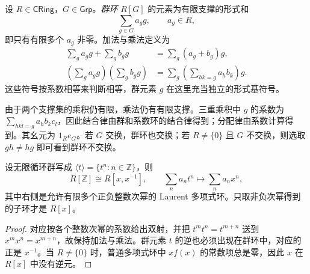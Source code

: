 \documentclass[lang=cn,a4paper,fontset=none,zihao=false,10pt,openany,twoside]{beautybook}
\numberwithin{algorithm}{chapter}
\begin{document}
\begin{definition}[群环]
设 $R\in\mathsf{CRing}$，$G\in\mathsf{Grp}$。\emph{群环} $R[G]$ 的元素为有限支撑的形式和
\[
 \sum_{g\in G}a_gg,\qquad a_g\in R,
\]
即只有有限多个 $a_g$ 非零。加法与乘法定义为
\[
 \begin{aligned}
 \sum_g a_gg+\sum_g b_gg&=\sum_g(a_g+b_g)g,\\
 \left(\sum_g a_gg\right)\left(\sum_g b_gg\right)
   &=\sum_g\left(\sum_{hk=g}a_hb_k\right)g.
 \end{aligned}
\]
这些符号按系数相等来判断相等，群元素 $g$ 在这里充当独立的形式基符号。
\end{definition}
由于两个支撑集的乘积仍有限，乘法仍有有限支撑。三重乘积中 $g$ 的系数为 $\sum_{hkl=g}a_hb_kc_l$，因此结合律由群和系数环的结合律得到；分配律由系数计算得到。其幺元为 $1_R e_G$。若 $G$ 交换，群环也交换；若 $R\ne\{0\}$ 且 $G$ 不交换，则选取 $gh\ne hg$ 即可看到群环不交换。

\begin{example}[无限循环群的群环]
设无限循环群写成 $\langle t\rangle=\{t^n:n\in\mathbb Z\}$，则
\[
 R[\mathbb Z]\cong R[x,x^{-1}],\qquad
 \sum_n a_nt^n\longmapsto\sum_n a_nx^n,
\]
其中右侧是允许有限多个正负整数次幂的 Laurent 多项式环。只取非负次幂得到的子环才是 $R[x]$。
\end{example}
\begin{proof}
对应按各个整数次幂的系数给出双射，并把 $t^mt^n=t^{m+n}$ 送到 $x^mx^n=x^{m+n}$，故保持加法与乘法。群元素 $t$ 的逆也必须出现在群环中，对应的正是 $x^{-1}$。当 $R\ne\{0\}$ 时，普通多项式环中 $xf(x)$ 的常数项总是零，因此 $x$ 在 $R[x]$ 中没有逆元。
\end{proof}
\end{document}
